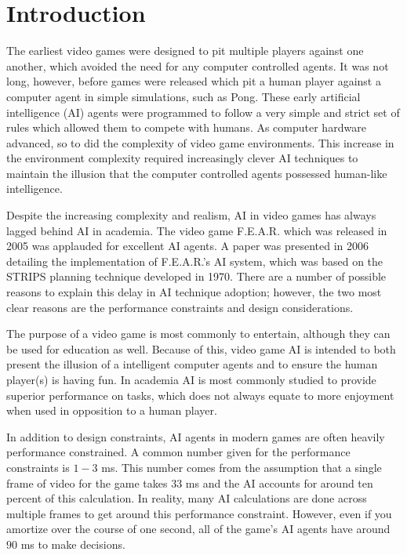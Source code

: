 \chapter{Introduction}

The earliest video games were designed to pit multiple players against one another, which avoided the need for any computer controlled agents. It was not long, however, before games were released which pit a human player against a computer agent in simple simulations, such as Pong. These early artificial intelligence (AI) agents were programmed to follow a very simple and strict set of rules which allowed them to compete with humans. As computer hardware advanced, so to did the complexity of video game environments. This increase in the environment complexity required increasingly clever AI techniques to maintain the illusion that the computer controlled agents possessed human-like intelligence. \cite{game:ai:history}

Despite the increasing complexity and realism, AI in video games has always lagged behind AI in academia. The video game F.E.A.R. which was released in 2005 was applauded for excellent AI agents. A paper was presented in 2006 detailing the implementation of F.E.A.R.'s AI system, which was based on the STRIPS planning technique developed in 1970. \cite{fear} There are a number of possible reasons to explain this delay in AI technique adoption; however, the two most clear reasons are the performance constraints and design considerations. \cite{game:ai:history}

The purpose of a video game is most commonly to entertain, although they can be used for education as well. Because of this, video game AI is intended to both present the illusion of a intelligent computer agents and to ensure the human player(s) is having fun. In academia AI is most commonly studied to provide superior performance on tasks, which does not always equate to more enjoyment when used in opposition to a human player.

In addition to design constraints, AI agents in modern games are often heavily performance constrained. A common number given for the performance constraints is $1-3$ ms. \cite{game:ai:lecture} This number comes from the assumption that a single frame of video for the game takes $33$ ms and the AI accounts for around ten percent of this calculation. In reality, many AI calculations are done across multiple frames to get around this performance constraint. However, even if you amortize over the course of one second, all of the game's AI agents have around $90$ ms to make decisions.

